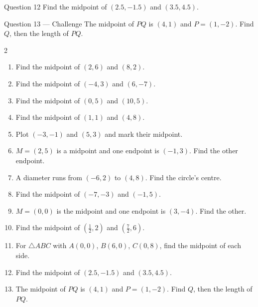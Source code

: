 \documentclass[11pt]{article}
\begin{document}
\begin{qbox}{Question 12}
Find the midpoint of $(2.5,-1.5)$ and $(3.5,4.5)$.\workspace{2.0cm}
\end{qbox}

\begin{qbox}{Question 13 --- Challenge}
The midpoint of $PQ$ is $(4,1)$ and $P=(1,-2)$. Find $Q$, then the length of $PQ$.\workspace{3.0cm}
\end{qbox}

\clearpage
{}

\begin{recapbox}
\begin{multicols}{2}
\small
\begin{enumerate}[leftmargin=*,itemsep=3pt]
  \item Find the midpoint of $(2,6)$ and $(8,2)$.
  \item Find the midpoint of $(-4,3)$ and $(6,-7)$.
  \item Find the midpoint of $(0,5)$ and $(10,5)$.
  \item Find the midpoint of $(1,1)$ and $(4,8)$.
  \item Plot $(-3,-1)$ and $(5,3)$ and mark their midpoint.
  \item $M=(2,5)$ is a midpoint and one endpoint is $(-1,3)$. Find the other endpoint.
  \item A diameter runs from $(-6,2)$ to $(4,8)$. Find the circle's centre.
  \item Find the midpoint of $(-7,-3)$ and $(-1,5)$.
  \item $M=(0,0)$ is the midpoint and one endpoint is $(3,-4)$. Find the other.
  \item Find the midpoint of $\left(\tfrac12,2\right)$ and $\left(\tfrac72,6\right)$.
  \item For $\triangle ABC$ with $A(0,0)$, $B(6,0)$, $C(0,8)$, find the midpoint of each side.
  \item Find the midpoint of $(2.5,-1.5)$ and $(3.5,4.5)$.
  \item The midpoint of $PQ$ is $(4,1)$ and $P=(1,-2)$. Find $Q$, then the length of $PQ$.
\end{enumerate}
\end{multicols}
\end{recapbox}
\end{document}
